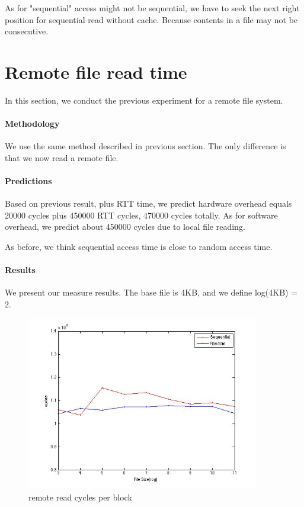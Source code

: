 As for "sequential" access might not be sequential, we have to seek the next right position for sequential read without cache. Because contents in a file may not be consecutive.

\section{Remote file read time}
In this section, we conduct the previous experiment for a remote file system.

\paragraph{Methodology}
We use the same method described in previous section. The only difference is that we now read a remote file. 

\paragraph{Predictions}
Based on previous result, plus RTT time, we predict hardware overhead equals  20000 cycles  plus 450000 RTT cycles, 470000 cycles totally. As for software overhead, we predict about 450000 cycles due to local file reading. 

As before, we think sequential access time is close to random access time. 

\paragraph{Results}

We present our measure results. The base file is 4KB, and we define log(4KB) = 2.

\begin{figure}[htbp] %
   \centering
   \includegraphics[width=4in]{./pics/43.jpg} 
   \caption{remote read cycles per block}
   \label{fig:remote read cycles per block}
\end{figure}

